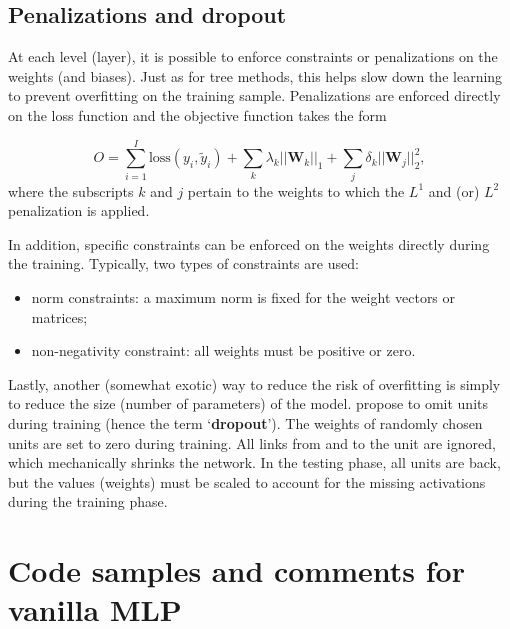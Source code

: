 \documentclass[]{krantz}
\providecommand{\tightlist}{%
  \setlength{\itemsep}{0pt}\setlength{\parskip}{0pt}}
\theoremstyle{definition}
\theoremstyle{definition}
\theoremstyle{definition}
\theoremstyle{remark}
\begin{document}
\hypertarget{penalizations-and-dropout}{%
\subsection{Penalizations and dropout}\label{penalizations-and-dropout}}

At each level (layer), it is possible to enforce constraints or
penalizations on the weights (and biases). Just as for tree methods,
this helps slow down the learning to prevent overfitting on the training
sample. Penalizations are enforced directly on the loss function and the
objective function takes the form

\[O=\sum_{i=1}^I \text{loss}(y_i,\tilde{y}_i)+ \sum_{k} \lambda_k||\textbf{W}_k||_1+ \sum_j\delta_k||\textbf{W}_j||_2^2,\]
where the subscripts \(k\) and \(j\) pertain to the weights to which the
\(L^1\) and (or) \(L^2\) penalization is applied.

In addition, specific constraints can be enforced on the weights
directly during the training. Typically, two types of constraints are
used:

\begin{itemize}
\tightlist
\item
  norm constraints: a maximum norm is fixed for the weight vectors or
  matrices;\\
\item
  non-negativity constraint: all weights must be positive or zero.
\end{itemize}

Lastly, another (somewhat exotic) way to reduce the risk of overfitting
is simply to reduce the size (number of parameters) of the model.
\citet{srivastava2014dropout} propose to omit units during training
(hence the term `\textbf{dropout}'). The weights of randomly chosen
units are set to zero during training. All links from and to the unit
are ignored, which mechanically shrinks the network. In the testing
phase, all units are back, but the values (weights) must be scaled to
account for the missing activations during the training phase.

\hypertarget{code-samples-and-comments-for-vanilla-mlp}{%
\section{Code samples and comments for vanilla
MLP}\label{code-samples-and-comments-for-vanilla-mlp}}
\end{document}
